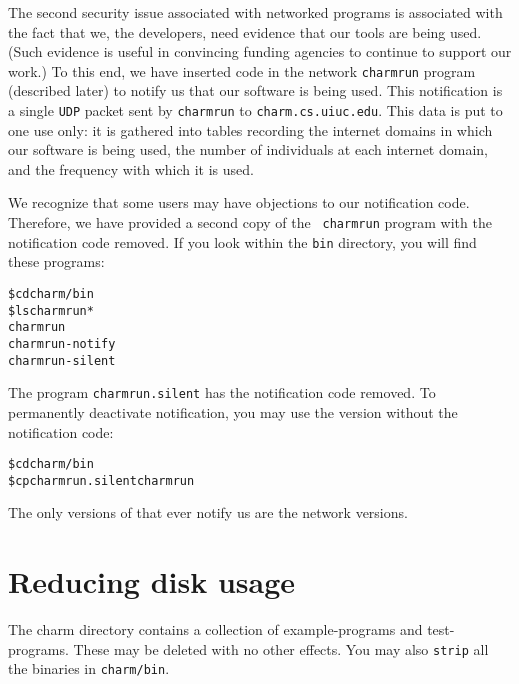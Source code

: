 The second security issue associated with networked programs is
associated with the fact that we, the \charmpp{} developers, need evidence
that our tools are being used.  (Such evidence is useful in convincing
funding agencies to continue to support our work.)  To this end, we
have inserted code in the network {\tt charmrun} program (described
later) to notify us that our software is being used.
This notification is a single {\tt UDP} packet sent by {\tt charmrun}
to {\tt charm.cs.uiuc.edu}.  This data is put
to one use only: it is gathered into tables recording the internet
domains in which our software is being used, the number of individuals
at each internet domain, and the frequency with which it is used.

We recognize that some users may have objections to our notification
code.  Therefore, we have provided a second copy of the {\tt
charmrun} program with the notification code removed.  If you look
within the {\tt bin} directory, you will find these programs:

\begin{alltt}
    \$ cd charm/bin
    \$ ls charmrun*
    charmrun
    charmrun-notify
    charmrun-silent
\end{alltt}

The program {\tt charmrun.silent} has the notification code removed.  To
permanently deactivate notification, you may use the version without the
notification code:

\begin{alltt}
    \$ cd charm/bin
    \$ cp charmrun.silent charmrun
\end{alltt}

The only versions of \charmpp{} that ever notify us are 
the network versions.


\section{Reducing disk usage}

The charm directory contains a collection of example-programs and
test-programs.  These may be deleted with no other effects. You may 
also {\tt strip} all the binaries in {\tt charm/bin}.






